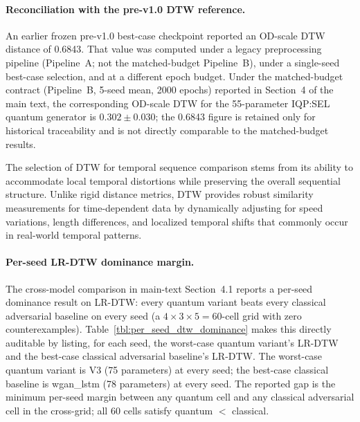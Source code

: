 \paragraph{Reconciliation with the pre-v1.0 DTW reference.}
An earlier frozen pre-v1.0 best-case checkpoint reported an OD-scale DTW distance of 0.6843. That value was computed under a legacy preprocessing pipeline (Pipeline~A; not the matched-budget Pipeline~B), under a single-seed best-case selection, and at a different epoch budget. Under the matched-budget contract (Pipeline~B, 5-seed mean, 2000 epochs) reported in Section~4 of the main text, the corresponding OD-scale DTW for the 55-parameter IQP:SEL quantum generator is $0.302 \pm 0.030$; the 0.6843 figure is retained only for historical traceability and is not directly comparable to the matched-budget results.

The selection of DTW for temporal sequence comparison stems from its ability to accommodate local temporal distortions while preserving the overall sequential structure. Unlike rigid distance metrics, DTW provides robust similarity measurements for time-dependent data by dynamically adjusting for speed variations, length differences, and localized temporal shifts that commonly occur in real-world temporal patterns.

\paragraph{Per-seed LR-DTW dominance margin.}
The cross-model comparison in main-text Section~4.1 reports a per-seed
dominance result on LR-DTW: every quantum variant beats every classical
adversarial baseline on every seed (a $4 \times 3 \times 5 = 60$-cell grid
with zero counterexamples). Table~\ref{tbl:per_seed_dtw_dominance} makes
this directly auditable by listing, for each seed, the worst-case quantum
variant's LR-DTW and the best-case classical adversarial baseline's
LR-DTW. The worst-case quantum variant is V3 (75 parameters) at every
seed; the best-case classical baseline is wgan\_lstm (78 parameters) at
every seed. The reported gap is the minimum per-seed margin between any
quantum cell and any classical adversarial cell in the cross-grid; all
60 cells satisfy quantum $<$ classical.

